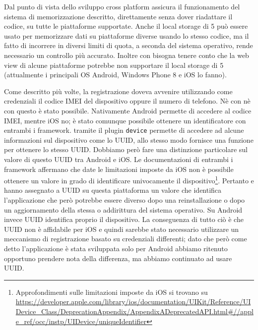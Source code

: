 			Dal punto di vista dello sviluppo cross platform \tisdk{} assicura il funzionamento 
			del sistema di memorizzazione descritto, direttamente senza dover riadattare il codice,
			su tutte le piattaforme supportate. Anche il local storage 
			di \html{}5 può essere usato per memorizzare dati su piattaforme diverse 
			usando lo stesso codice, ma il fatto di incorrere in diversi limiti di quota, 
			a seconda del sistema operativo, rende necessario un controllo più 
			accurato. Inoltre con \pg{} bisogna tenere conto che la web view di 
			alcune piattaforme potrebbe non supportare il local storage di \html{}5 
			(attualmente i principali OS Android, Windows Phone 8 e iOS lo fanno).
			
			Come descritto più volte, la registrazione doveva avvenire utilizzando 
			come credenziali il codice IMEI del dispositivo oppure il numero di telefono.
			Nè con \pg{} nè con \tisdk{} questo è stato possibile. Nativamente 
			Android permette di accedere al codice IMEI, mentre iOS no; è stato 
			comunque possibile ottenere un identificatore con entrambi i 
			framework. \pg{} tramite il plugin \texttt{device} permette di accedere 
			ad alcune informazioni sul dispositivo come lo UUID, allo stesso 
			modo \tisdk{} fornisce una funzione per ottenere lo stesso UUID.
			Dobbiamo però fare una distinzione particolare sul valore di questo 
			UUID tra Android e iOS. 
			Le documentazioni di entrambi i framework affermano che date le limitazioni 
			imposte da iOS non è possibile ottenere un valore in grado di identificare 
			univocamente il dispositivo\footnote{Approfondimenti sulle limitazioni 
			imposte da iOS si trovano su \url{https://developer.apple.com/library/ios/documentation/UIKit/Reference/UIDevice_Class/DeprecationAppendix/AppendixADeprecatedAPI.html\#//apple_ref/occ/instp/UIDevice/uniqueIdentifier}}. 
			Pertanto \pg{} e \tisdk{} hanno assegnato a UUID su questa piattaforma 
			un valore che identifica l'applicazione che però potrebbe essere diverso 
			dopo una reinstallazione o dopo 
			un aggiornamento della stessa o addirittura del sistema operativo. 
			Su Android invece UUID 
			identifica proprio il dispositivo. La conseguenza di tutto ciò è che 
			UUID non è affidabile per iOS e quindi sarebbe stato necessario utilizzare 
			un meccanismo di registrazione basato su credenziali differenti; 
			dato che però come detto l'applicazione è stata sviluppata solo per Android 
			abbiamo ritenuto opportuno prendere nota della differenza, ma abbiamo 
			continuato ad usare UUID.
			
